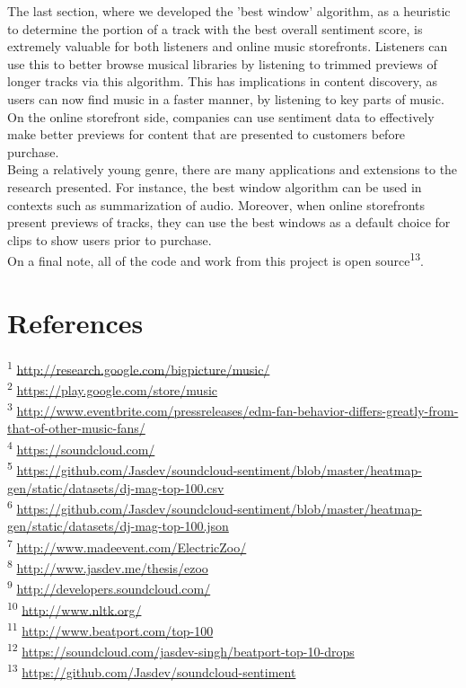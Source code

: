 \documentclass[12pt]{dalcsthesis}
\begin{document}
The last section, where we developed the 'best window' algorithm, as a heuristic to determine the portion of a track with the best overall sentiment score, is extremely valuable for both listeners and online music storefronts. Listeners can use this to better browse musical libraries by listening to trimmed previews of longer tracks via this algorithm. This has implications in content discovery, as users can now find music in a faster manner, by listening to key parts of music. On the online storefront side, companies can use sentiment data to effectively make better previews for content that are presented to customers before purchase. \\

Being a relatively young genre, there are many applications and extensions to the research presented. For instance, the best window algorithm can be used in contexts such as summarization of audio. Moreover, when online storefronts present previews of tracks, they can use the best windows as a default choice for clips to show users prior to purchase. \\

On a final note, all of the code and work from this project is open source\textsuperscript{13}.

\chapter{References}

\textsuperscript{1} \url{http://research.google.com/bigpicture/music/} \\
\textsuperscript{2} \url{https://play.google.com/store/music} \\
\textsuperscript{3} \url{http://www.eventbrite.com/pressreleases/edm-fan-behavior-differs-greatly-from-that-of-other-music-fans/} \\
\textsuperscript{4} \url{https://soundcloud.com/} \\
\textsuperscript{5} \url{https://github.com/Jasdev/soundcloud-sentiment/blob/master/heatmap-gen/static/datasets/dj-mag-top-100.csv} \\
\textsuperscript{6} \url{https://github.com/Jasdev/soundcloud-sentiment/blob/master/heatmap-gen/static/datasets/dj-mag-top-100.json} \\
\textsuperscript{7} \url{http://www.madeevent.com/ElectricZoo/} \\
\textsuperscript{8} \url{http://www.jasdev.me/thesis/ezoo} \\
\textsuperscript{9} \url{http://developers.soundcloud.com/} \\
\textsuperscript{10} \url{http://www.nltk.org/} \\
\textsuperscript{11} \url{http://www.beatport.com/top-100} \\
\textsuperscript{12} \url{https://soundcloud.com/jasdev-singh/beatport-top-10-drops} \\
\textsuperscript{13} \url{https://github.com/Jasdev/soundcloud-sentiment}



\end{document}

